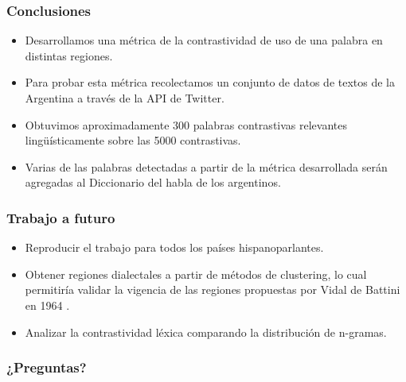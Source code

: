 \begin{frame}[c]\frametitle{Conclusiones}
    
    \begin{itemize}
        \item Desarrollamos una métrica de la contrastividad de uso de una palabra en distintas regiones.
        \item Para probar esta métrica recolectamos un conjunto de datos de textos de la Argentina a través de la API de Twitter.
        \item Obtuvimos aproximadamente 300 palabras contrastivas relevantes lingüísticamente sobre las 5000 contrastivas.
        \item Varias de las palabras detectadas a partir de la métrica desarrollada serán agregadas al Diccionario del habla de los argentinos.
    \end{itemize}

\end{frame}

\begin{frame}[c]\frametitle{Trabajo a futuro}
    
    \begin{itemize}
        \item Reproducir el trabajo para todos los países hispanoparlantes.
        \item Obtener regiones dialectales a partir de métodos de clustering, lo cual permitiría validar la vigencia de las regiones propuestas por Vidal de Battini en 1964 \cite{vidal1964espanol}.
        \item Analizar la contrastividad léxica comparando la distribución de n-gramas.
    \end{itemize}

\end{frame}

\begin{frame}[c]\frametitle{¿Preguntas?}
    
    \pause
\end{frame}
